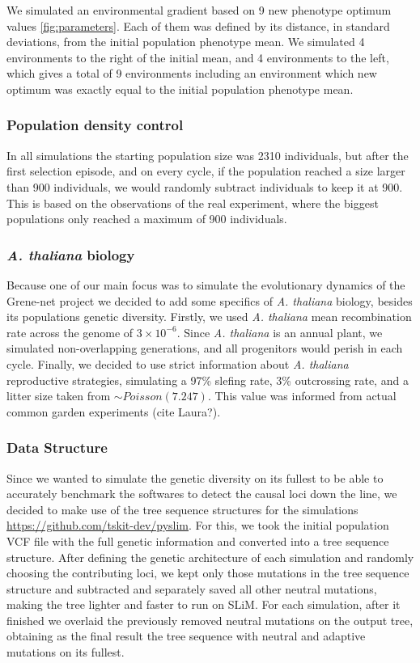 \documentclass{article}
\begin{document}
We simulated an environmental gradient based on 9 new phenotype optimum values \ref{fig:parameters}. Each of them was defined by its distance, in standard deviations, from the initial population phenotype mean. We simulated 4 environments to the right of the initial mean, and 4 environments to the left, which gives a total of 9 environments including an environment which new optimum was exactly equal to the initial population phenotype mean. 

\subsubsection{Population density control}
In all simulations the starting population size was 2310 individuals, but after the first selection episode, and on every cycle, if the population reached a size larger than 900 individuals, we would randomly subtract individuals to keep it at 900. This is based on the observations of the real experiment, where the biggest populations only reached a maximum of 900 individuals. 


\subsubsection{\textit{A. thaliana} biology}
Because one of our main focus was to simulate the evolutionary dynamics of the Grene-net project we decided to add some specifics of \textit{A. thaliana} biology, besides its populations genetic diversity. Firstly, we used \textit{A. thaliana} mean recombination rate across the genome of $3 \times 10^{-6}$. Since \textit{A. thaliana} is an annual plant, we simulated non-overlapping generations, and all progenitors would perish in each cycle. Finally, we decided to use strict information about \textit{A. thaliana} reproductive strategies, simulating a 97\% slefing rate, 3\% outcrossing rate, and a litter size taken from $\sim Poisson(7.247)$. This value was informed from actual common garden experiments (cite Laura?). 

\subsubsection{Data Structure}
Since we wanted to simulate the genetic diversity on its fullest to be able to accurately benchmark the softwares to detect the causal loci down the line, we decided to make use of the tree sequence structures for the simulations \url{https://github.com/tskit-dev/pyslim}. For this, we took the initial population VCF file with the full genetic information and converted into a tree sequence structure. After defining the genetic architecture of each simulation and randomly choosing the contributing loci, we kept only those mutations in the tree sequence structure and subtracted and separately saved all other neutral mutations, making the tree lighter and faster to run on SLiM. For each simulation, after it finished we overlaid the previously removed neutral mutations on the output tree, obtaining as the final result the tree sequence with neutral and adaptive mutations on its fullest. 
\end{document}
